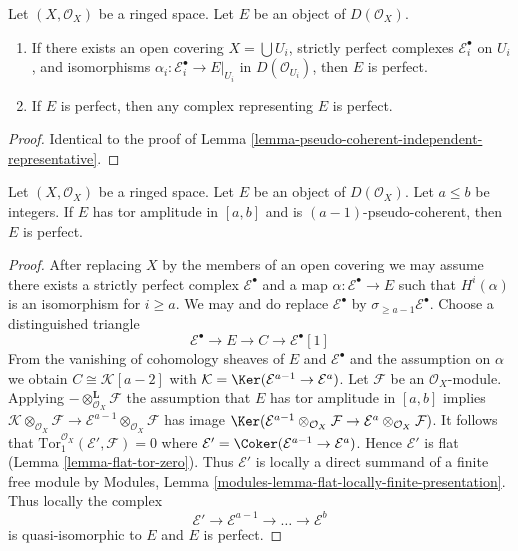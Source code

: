 \begin{lemma}
\label{lemma-perfect-independent-representative}
Let $(X, \mathcal{O}_X)$ be a ringed space.
Let $E$ be an object of $D(\mathcal{O}_X)$.
\begin{enumerate}
\item If there exists an open covering $X = \bigcup U_i$,
strictly perfect complexes $\mathcal{E}_i^\bullet$ on $U_i$,
and isomorphisms $\alpha_i : \mathcal{E}_i^\bullet \to E|_{U_i}$ in
$D(\mathcal{O}_{U_i})$, then $E$ is perfect.
\item If $E$ is perfect, then any complex representing $E$ is perfect.
\end{enumerate}
\end{lemma}

\begin{proof}
Identical to the proof of
Lemma \ref{lemma-pseudo-coherent-independent-representative}.
\end{proof}

\begin{lemma}
\label{lemma-perfect-precise}
Let $(X, \mathcal{O}_X)$ be a ringed space.
Let $E$ be an object of $D(\mathcal{O}_X)$.
Let $a \leq b$ be integers. If $E$ has tor amplitude in $[a, b]$
and is $(a - 1)$-pseudo-coherent, then $E$ is perfect.
\end{lemma}

\begin{proof}
After replacing $X$ by the members of an open covering we may assume there
exists a strictly perfect complex $\mathcal{E}^\bullet$ and a map
$\alpha : \mathcal{E}^\bullet \to E$ such that $H^i(\alpha)$ is an isomorphism
for $i \geq a$. We may and do replace $\mathcal{E}^\bullet$ by
$\sigma_{\geq a - 1}\mathcal{E}^\bullet$. Choose a distinguished triangle
$$
\mathcal{E}^\bullet \to E \to C \to \mathcal{E}^\bullet[1]
$$
From the vanishing of cohomology sheaves of $E$ and $\mathcal{E}^\bullet$
and the assumption on $\alpha$ we obtain $C \cong \mathcal{K}[a - 2]$ with
$\mathcal{K} = \Ker(\mathcal{E}^{a - 1} \to \mathcal{E}^a)$.
Let $\mathcal{F}$ be an $\mathcal{O}_X$-module.
Applying $- \otimes_{\mathcal{O}_X}^\mathbf{L} \mathcal{F}$
the assumption that $E$ has tor amplitude in $[a, b]$
implies $\mathcal{K} \otimes_{\mathcal{O}_X} \mathcal{F} \to
\mathcal{E}^{a - 1} \otimes_{\mathcal{O}_X} \mathcal{F}$ has image
$\Ker(\mathcal{E}^{a - 1} \otimes_{\mathcal{O}_X} \mathcal{F}
\to \mathcal{E}^a \otimes_{\mathcal{O}_X} \mathcal{F})$.
It follows that $\text{Tor}_1^{\mathcal{O}_X}(\mathcal{E}', \mathcal{F}) = 0$
where $\mathcal{E}' = \Coker(\mathcal{E}^{a - 1} \to \mathcal{E}^a)$.
Hence $\mathcal{E}'$ is flat (Lemma \ref{lemma-flat-tor-zero}).
Thus $\mathcal{E}'$ is locally a direct summand of a finite free module by
Modules, Lemma \ref{modules-lemma-flat-locally-finite-presentation}.
Thus locally the complex
$$
\mathcal{E}' \to \mathcal{E}^{a - 1} \to \ldots \to \mathcal{E}^b
$$
is quasi-isomorphic to $E$ and $E$ is perfect.
\end{proof}

